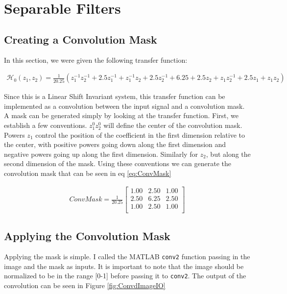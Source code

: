 
\section{Separable Filters}
\subsection{Creating a Convolution Mask}
\noindent In this section, we were given the following transfer function:

\begin{gather}
    \mathcal{H}_0(z_1, z_2) = \frac{1}{20.25}(z_1^{-1}z_2^{-1}+2.5z_1^{-1}+z_1^{-1}z_2+2.5z_2^{-1}+6.25+2.5z_2+z_1z_2^{-1}+2.5z_1+z_1z_2)
\end{gather}

Since this is a Linear Shift Invariant system, this transfer function can be implemented as a convolution between the input signal and a convolution mask. A mask can be generated simply by looking at the transfer function. First, we establish a few conventions. $z_1^0z_2^0$ will define the center of the convolution mask. Powers $z_1$ control the position of the coefficient in the first dimension relative to the center, with positive powers going down along the first dimension and negative powers going up along the first dimension. Similarly for $z_2$, but along the second dimension of the mask. Using these conventions we can generate the convolution mask that can be seen in eq \ref{eq:ConvMask} 

\begin{gather}
    ConvMask = \frac{1}{20.25}
    \begin{bmatrix}
            1.00 & 2.50 & 1.00 \\
            2.50 & 6.25 & 2.50 \\
            1.00 & 2.50 & 1.00 \\
    \end{bmatrix}
    \label{eq:ConvMask} 
\end{gather}

\subsection{Applying the Convolution Mask}
Applying the mask is simple. I called the MATLAB \textcolor{MATLABBlue}{\lstinline|conv2|} function passing in the image and the mask as inputs. It is important to note that the image should be normalized to be in the range [0-1] before passing it to \textcolor{MATLABBlue}{\lstinline|conv2|}. The output of the convolution can be seen in Figure \ref{fig:ConvdImageIO}

